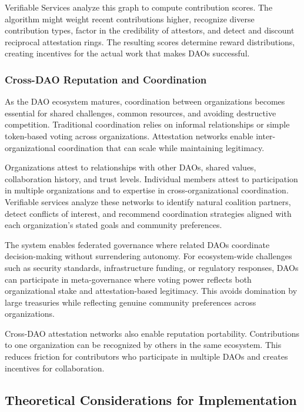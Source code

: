 Verifiable Services analyze this graph to compute contribution scores. The algorithm might weight recent contributions higher, recognize diverse contribution types, factor in the credibility of attestors, and detect and discount reciprocal attestation rings. The resulting scores determine reward distributions, creating incentives for the actual work that makes DAOs successful.

\subsubsection{Cross-DAO Reputation and Coordination}

As the DAO ecosystem matures, coordination between organizations becomes essential for shared challenges, common resources, and avoiding destructive competition. Traditional coordination relies on informal relationships or simple token-based voting across organizations. Attestation networks enable inter-organizational coordination that can scale while maintaining legitimacy.

Organizations attest to relationships with other DAOs, shared values, collaboration history, and trust levels. Individual members attest to participation in multiple organizations and to expertise in cross-organizational coordination. Verifiable services analyze these networks to identify natural coalition partners, detect conflicts of interest, and recommend coordination strategies aligned with each organization's stated goals and community preferences.

The system enables federated governance where related DAOs coordinate decision-making without surrendering autonomy. For ecosystem-wide challenges such as security standards, infrastructure funding, or regulatory responses, DAOs can participate in meta-governance where voting power reflects both organizational stake and attestation-based legitimacy. This avoids domination by large treasuries while reflecting genuine community preferences across organizations.

Cross-DAO attestation networks also enable reputation portability. Contributions to one organization can be recognized by others in the same ecosystem. This reduces friction for contributors who participate in multiple DAOs and creates incentives for collaboration.

\subsection{Theoretical Considerations for Implementation}

